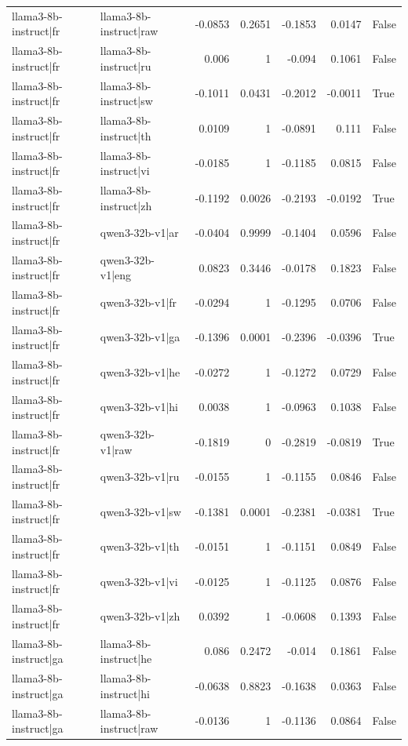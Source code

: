 \begin{table}
\begin{tabular}{l l r r r r l}
llama3-8b-instruct|fr & llama3-8b-instruct|raw & -0.0853 & 0.2651 & -0.1853 & 0.0147 & False \\
llama3-8b-instruct|fr & llama3-8b-instruct|ru & 0.006 & 1 & -0.094 & 0.1061 & False \\
llama3-8b-instruct|fr & llama3-8b-instruct|sw & -0.1011 & 0.0431 & -0.2012 & -0.0011 & True \\
llama3-8b-instruct|fr & llama3-8b-instruct|th & 0.0109 & 1 & -0.0891 & 0.111 & False \\
llama3-8b-instruct|fr & llama3-8b-instruct|vi & -0.0185 & 1 & -0.1185 & 0.0815 & False \\
llama3-8b-instruct|fr & llama3-8b-instruct|zh & -0.1192 & 0.0026 & -0.2193 & -0.0192 & True \\
llama3-8b-instruct|fr & qwen3-32b-v1|ar & -0.0404 & 0.9999 & -0.1404 & 0.0596 & False \\
llama3-8b-instruct|fr & qwen3-32b-v1|eng & 0.0823 & 0.3446 & -0.0178 & 0.1823 & False \\
llama3-8b-instruct|fr & qwen3-32b-v1|fr & -0.0294 & 1 & -0.1295 & 0.0706 & False \\
llama3-8b-instruct|fr & qwen3-32b-v1|ga & -0.1396 & 0.0001 & -0.2396 & -0.0396 & True \\
llama3-8b-instruct|fr & qwen3-32b-v1|he & -0.0272 & 1 & -0.1272 & 0.0729 & False \\
llama3-8b-instruct|fr & qwen3-32b-v1|hi & 0.0038 & 1 & -0.0963 & 0.1038 & False \\
llama3-8b-instruct|fr & qwen3-32b-v1|raw & -0.1819 & 0 & -0.2819 & -0.0819 & True \\
llama3-8b-instruct|fr & qwen3-32b-v1|ru & -0.0155 & 1 & -0.1155 & 0.0846 & False \\
llama3-8b-instruct|fr & qwen3-32b-v1|sw & -0.1381 & 0.0001 & -0.2381 & -0.0381 & True \\
llama3-8b-instruct|fr & qwen3-32b-v1|th & -0.0151 & 1 & -0.1151 & 0.0849 & False \\
llama3-8b-instruct|fr & qwen3-32b-v1|vi & -0.0125 & 1 & -0.1125 & 0.0876 & False \\
llama3-8b-instruct|fr & qwen3-32b-v1|zh & 0.0392 & 1 & -0.0608 & 0.1393 & False \\
llama3-8b-instruct|ga & llama3-8b-instruct|he & 0.086 & 0.2472 & -0.014 & 0.1861 & False \\
llama3-8b-instruct|ga & llama3-8b-instruct|hi & -0.0638 & 0.8823 & -0.1638 & 0.0363 & False \\
llama3-8b-instruct|ga & llama3-8b-instruct|raw & -0.0136 & 1 & -0.1136 & 0.0864 & False \\

\end{tabular}
\end{table}
